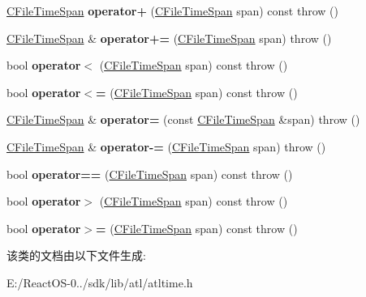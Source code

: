 \begin{DoxyCompactItemize}
\hyperlink{class_a_t_l_1_1_c_file_time_span}{C\+File\+Time\+Span} {\bfseries operator+} (\hyperlink{class_a_t_l_1_1_c_file_time_span}{C\+File\+Time\+Span} span) const  throw ()
\item 
\mbox{\label{class_a_t_l_1_1_c_file_time_span_aa3625785be18b5ba06ff7dd039682cda}} 
\hyperlink{class_a_t_l_1_1_c_file_time_span}{C\+File\+Time\+Span} \& {\bfseries operator+=} (\hyperlink{class_a_t_l_1_1_c_file_time_span}{C\+File\+Time\+Span} span)  throw ()
\item 
\mbox{\label{class_a_t_l_1_1_c_file_time_span_ae996e30af108ba56bf83cf886d12927e}} 
bool {\bfseries operator$<$} (\hyperlink{class_a_t_l_1_1_c_file_time_span}{C\+File\+Time\+Span} span) const  throw ()
\item 
\mbox{\label{class_a_t_l_1_1_c_file_time_span_a5b1267b361af8c9e0a832f4fca032019}} 
bool {\bfseries operator$<$=} (\hyperlink{class_a_t_l_1_1_c_file_time_span}{C\+File\+Time\+Span} span) const  throw ()
\item 
\mbox{\label{class_a_t_l_1_1_c_file_time_span_a5741d595e417d8742b3cd8620830d2a1}} 
\hyperlink{class_a_t_l_1_1_c_file_time_span}{C\+File\+Time\+Span} \& {\bfseries operator=} (const \hyperlink{class_a_t_l_1_1_c_file_time_span}{C\+File\+Time\+Span} \&span)  throw ()
\item 
\mbox{\label{class_a_t_l_1_1_c_file_time_span_a33c366028136aecc30bc7937ba482111}} 
\hyperlink{class_a_t_l_1_1_c_file_time_span}{C\+File\+Time\+Span} \& {\bfseries operator-\/=} (\hyperlink{class_a_t_l_1_1_c_file_time_span}{C\+File\+Time\+Span} span)  throw ()
\item 
\mbox{\label{class_a_t_l_1_1_c_file_time_span_a2f5a2ae8e6de20031d9eed381a6fd8b7}} 
bool {\bfseries operator==} (\hyperlink{class_a_t_l_1_1_c_file_time_span}{C\+File\+Time\+Span} span) const  throw ()
\item 
\mbox{\label{class_a_t_l_1_1_c_file_time_span_ad46139393c14f0547e24e315382008e6}} 
bool {\bfseries operator$>$} (\hyperlink{class_a_t_l_1_1_c_file_time_span}{C\+File\+Time\+Span} span) const  throw ()
\item 
\mbox{\label{class_a_t_l_1_1_c_file_time_span_aca8fafc5e44cfddda84b2d5867500896}} 
bool {\bfseries operator$>$=} (\hyperlink{class_a_t_l_1_1_c_file_time_span}{C\+File\+Time\+Span} span) const  throw ()
\end{DoxyCompactItemize}


该类的文档由以下文件生成\+:\begin{DoxyCompactItemize}
\item 
E\+:/\+React\+O\+S-\/0../sdk/lib/atl/atltime.\+h\end{DoxyCompactItemize}
